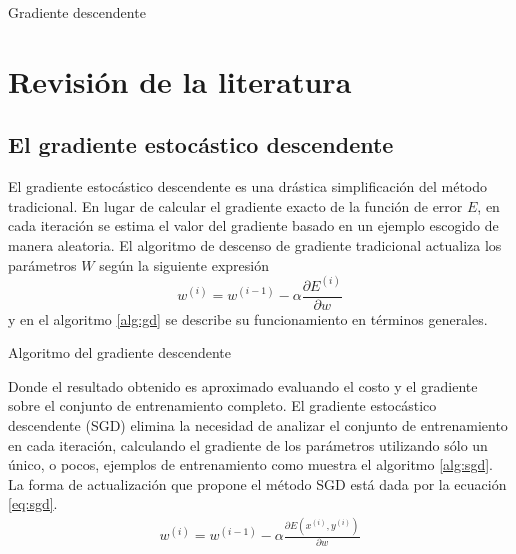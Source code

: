 \begin{imagen}
	\scalebox{1.0}{}
	\caption{Gradiente descendente}
	\label{fig:vanishing}
\end{imagen}


\section{Revisión de la literatura}
\subsection{El gradiente estocástico descendente}
El gradiente estocástico descendente es una drástica simplificación del método tradicional. En lugar de calcular el gradiente exacto de la función de error $E$, en cada iteración se estima el valor del gradiente basado en un ejemplo escogido de manera aleatoria. El algoritmo de descenso de gradiente tradicional actualiza los parámetros $W$ según la siguiente expresión
$$ w^{(i)} = w^{(i - 1)} - \alpha\frac{\partial E^{(i)}}{\partial w} $$ y en el algoritmo \ref{alg:gd} se describe su funcionamiento en términos generales.

\begin{algorithm}[H]
 \caption{Algoritmo del gradiente descendente}
 \label{alg:gd}
\end{algorithm}

Donde el resultado obtenido es aproximado evaluando el costo y el gradiente sobre el conjunto de entrenamiento completo. El gradiente estocástico descendente (SGD) elimina la necesidad de analizar el conjunto de entrenamiento en cada iteración, calculando el gradiente de los parámetros utilizando sólo un único, o pocos, ejemplos de entrenamiento como muestra el algoritmo \ref{alg:sgd}. La forma de actualización que propone el método SGD está dada por la ecuación \ref{eq:sgd}.
\begin{eqnarray}
	w^{(i)} = w^{(i - 1)} - \alpha\frac{\partial E(x^{(i)}, y^{(i)})}{\partial w}\label{eq:sgd}
\end{eqnarray}

